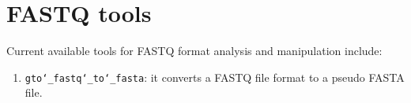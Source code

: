 \chapter{FASTQ tools}
\label{fastq}

Current available tools for FASTQ format analysis and manipulation include:
\begin{enumerate}

\item \texttt{gto\char`_fastq\char`_to\char`_fasta}: it converts a FASTQ file format to a pseudo FASTA file.

\end{enumerate}


